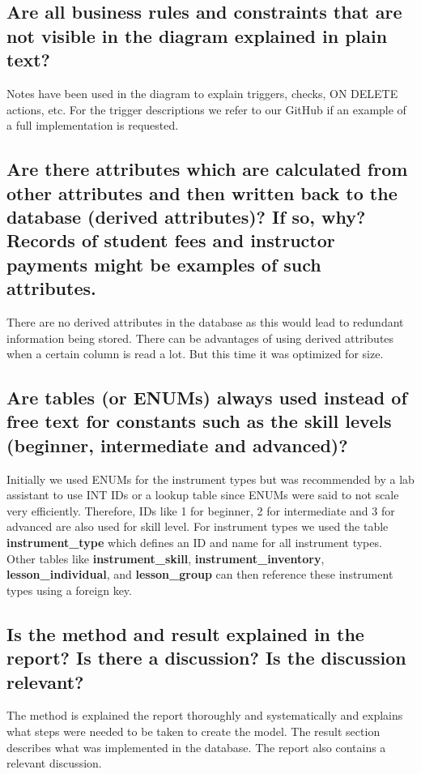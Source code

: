 \documentclass[a4paper]{scrartcl}
\begin{document}
\subsection{Are all business rules and constraints that are not visible in the diagram explained in plain text?}
Notes have been used in the diagram to explain triggers, checks, ON DELETE actions, etc. For the trigger descriptions we refer to our GitHub if an example of a full implementation is requested.

\subsection{Are there attributes which are calculated from other attributes and then written back to the database (derived attributes)? If so, why? Records of student fees and instructor payments might be examples of such attributes.}

There are no derived attributes in the database as this would lead to redundant information being stored. There can be advantages of using derived attributes when a certain column is read a lot. But this time it was optimized for size.

\subsection{Are tables (or ENUMs) always used instead of free text for constants such as the skill levels (beginner, intermediate and advanced)?}
Initially we used ENUMs for the instrument types but was recommended by a lab assistant to use INT IDs or a lookup table since ENUMs were said to not scale very efficiently. Therefore, IDs like 1 for beginner, 2 for intermediate and 3 for advanced are also used for skill level. For instrument types we used the table \textbf{instrument\_type} which defines an ID and name for all instrument types. Other tables like \textbf{instrument\_skill}, \textbf{instrument\_inventory}, \textbf{lesson\_individual}, and \textbf{lesson\_group} can then reference these instrument types using a foreign key.

\subsection{Is the method and result explained in the report? Is there a discussion? Is the discussion relevant?}

The method is explained the report thoroughly and systematically and explains what steps were needed to be taken to create the model. The result section describes what was implemented in the database. The report also contains a relevant discussion.  
\end{document}
